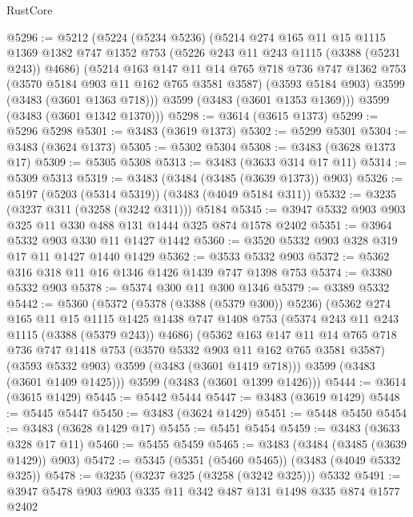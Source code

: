 \begin{lexlean}{RustCore}
\begin{coremodule}
@5296 := @5212
    (@5224
      (@5234 @5236)
      (@5214
        @274
        @165
        @11
        @15
        @1115
        @1369
        @1382
        @747
        @1352
        @753
        (@5226 @243 @11 @243 @1115 (@3388 (@5231 @243)) @4686)
        (@5214
          @163
          @147
          @11
          @14
          @765
          @718
          @736
          @747
          @1362
          @753
          (@3570 @5184 @903 @11 @162 @765 @3581 @3587)
          (@3593 @5184 @903)
          @3599
          (@3483 (@3601 @1363 @718)))
        @3599
        (@3483 (@3601 @1353 @1369)))
      @3599
      (@3483 (@3601 @1342 @1370)))
@5298 := @3614 (@3615 @1373)
@5299 := @5296 @5298
@5301 := @3483 (@3619 @1373)
@5302 := @5299 @5301
@5304 := @3483 (@3624 @1373)
@5305 := @5302 @5304
@5308 := @3483 (@3628 @1373 @17)
@5309 := @5305 @5308
@5313 := @3483 (@3633 @314 @17 @11)
@5314 := @5309 @5313
@5319 := @3483 (@3484 (@3485 (@3639 @1373)) @903)
@5326 := @5197 (@5203 (@5314 @5319)) (@3483 (@4049 @5184 @311))
@5332 := @3235 (@3237 @311 (@3258 (@3242 @311))) @5184
@5345 := @3947 @5332 @903 @903 @325 @11 @330 @488 @131 @1444 @325 @874 @1578 @2402
@5351 := @3964 @5332 @903 @330 @11 @1427 @1442
@5360 := @3520 @5332 @903 @328 @319 @17 @11 @1427 @1440 @1429
@5362 := @3533 @5332 @903
@5372 := @5362 @316 @318 @11 @16 @1346 @1426 @1439 @747 @1398 @753
@5374 := @3380 @5332 @903
@5378 := @5374 @300 @11 @300 @1346
@5379 := @3389 @5332
@5442 := @5360
    (@5372
      (@5378 (@3388 (@5379 @300)) @5236)
      (@5362
        @274
        @165
        @11
        @15
        @1115
        @1425
        @1438
        @747
        @1408
        @753
        (@5374 @243 @11 @243 @1115 (@3388 (@5379 @243)) @4686)
        (@5362
          @163
          @147
          @11
          @14
          @765
          @718
          @736
          @747
          @1418
          @753
          (@3570 @5332 @903 @11 @162 @765 @3581 @3587)
          (@3593 @5332 @903)
          @3599
          (@3483 (@3601 @1419 @718)))
        @3599
        (@3483 (@3601 @1409 @1425)))
      @3599
      (@3483 (@3601 @1399 @1426)))
@5444 := @3614 (@3615 @1429)
@5445 := @5442 @5444
@5447 := @3483 (@3619 @1429)
@5448 := @5445 @5447
@5450 := @3483 (@3624 @1429)
@5451 := @5448 @5450
@5454 := @3483 (@3628 @1429 @17)
@5455 := @5451 @5454
@5459 := @3483 (@3633 @328 @17 @11)
@5460 := @5455 @5459
@5465 := @3483 (@3484 (@3485 (@3639 @1429)) @903)
@5472 := @5345 (@5351 (@5460 @5465)) (@3483 (@4049 @5332 @325))
@5478 := @3235 (@3237 @325 (@3258 (@3242 @325))) @5332
@5491 := @3947 @5478 @903 @903 @335 @11 @342 @487 @131 @1498 @335 @874 @1577 @2402

\end{coremodule}
\end{lexlean}
